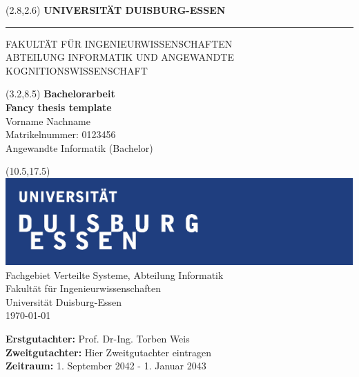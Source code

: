 \begin{titlepage}
\vspace*{-1cm}
\newlength{\links}
\setlength{\links}{0.9cm}
\setlength{\TPHorizModule}{1cm}
\setlength{\TPVertModule}{1cm}
\textblockorigin{0pt}{0pt}

\sffamily
\LARGE

\begin{textblock}{16.5}(2.8,2.6)
 \hspace*{-0.25cm} \textbf{UNIVERSITÄT DUISBURG-ESSEN} \\
 \hspace*{-1.15cm} \rule{5mm}{5mm} \hspace*{0.05cm} FAKULTÄT FÜR INGENIEURWISSENSCHAFTEN\\
 \large{}ABTEILUNG INFORMATIK UND ANGEWANDTE KOGNITIONSWISSENSCHAFT\\
\end{textblock}


\begin{textblock}{14.5}(3.2,8.5)
  \large
{ \textbf{Bachelorarbeit}} \\[1cm]
{\LARGE \Large\textbf{Fancy thesis template}} \\[1.3cm]
Vorname Nachname\\
Matrikelnummer: 0123456\\
Angewandte Informatik (Bachelor)
\end{textblock}



\begin{textblock}{10}(10.5,17.5)
\includegraphics[scale=1.0]{images/unilogo.pdf}\\
\normalsize
\raggedleft
Fachgebiet Verteilte Systeme, Abteilung Informatik \\
Fakultät für Ingenieurwissenschaften \\
Universität Duisburg-Essen \\[2ex]

\today\\[15ex]
\raggedright
{\textbf{Erstgutachter:}} Prof. Dr-Ing. Torben Weis \\
{\textbf{Zweitgutachter:}} Hier Zweitgutachter eintragen \\
{\textbf{Zeitraum:}} 1. September 2042 - 1. Januar 2043 \\
\end{textblock}

\end{titlepage}
